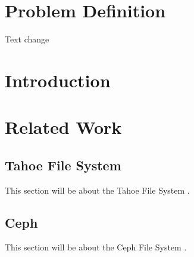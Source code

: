 \documentclass[11pt]{article}
\begin{document}
\newpage

\section{Problem Definition}
Text change

\section{Introduction}


\section{Related Work}
\subsection{Tahoe File System}
This section will be about the Tahoe File System
\cite{WilcoxOHearn:2008p1275}.

\subsection{Ceph}
This section will be about the Ceph File System
\cite{Weil:2012p1035,Weil:2012p1010,Weil:2006p1273}.

\nocite{*}

\end{document}
